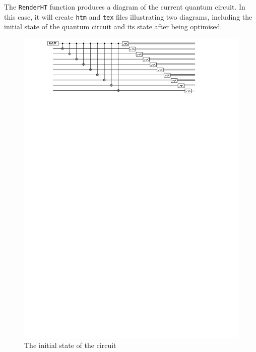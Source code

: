 \documentclass[12pt]{third-rep}
\begin{document}
The \texttt{RenderHT} function produces a diagram of the current quantum circuit. In this case, it will create \texttt{htm} and \texttt{tex} files illustrating two diagrams, including the initial state of the quantum circuit and its state after being optimised.
\begin{figure}[ht]
\centering
\includegraphics[width=15cm]{circuit1}
\caption{The initial state of the circuit}
\end{figure}
\end{document}
